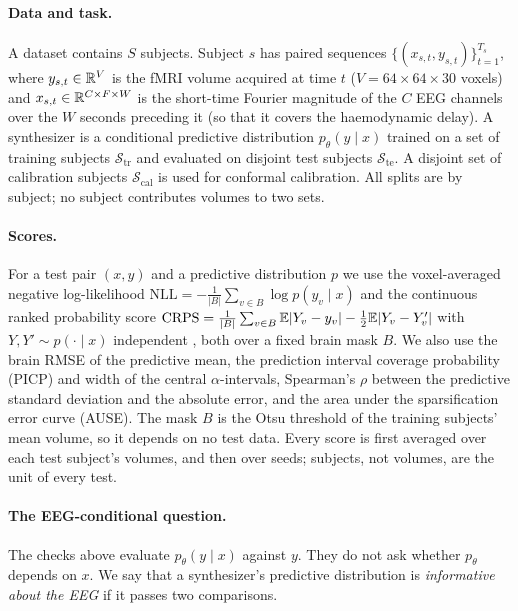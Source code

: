 \paragraph{Data and task.} A dataset contains $S$ subjects. Subject $s$ has paired sequences $\{(x_{s,t}, y_{s,t})\}_{t=1}^{T_s}$, where $y_{s,t}\in\mathbb{R}^{V}$ is the fMRI volume acquired at time $t$ ($V = 64\times 64\times 30$ voxels) and $x_{s,t}\in\mathbb{R}^{C\times F\times W}$ is the short-time Fourier magnitude of the $C$ EEG channels over the $W$ seconds preceding it (so that it covers the haemodynamic delay). A synthesizer is a conditional predictive distribution $p_\theta(y\mid x)$ trained on a set of training subjects $\mathcal{S}_{\mathrm{tr}}$ and evaluated on disjoint test subjects $\mathcal{S}_{\mathrm{te}}$. A disjoint set of calibration subjects $\mathcal{S}_{\mathrm{cal}}$ is used for conformal calibration. All splits are by subject; no subject contributes volumes to two sets.

\paragraph{Scores.} For a test pair $(x,y)$ and a predictive distribution $p$ we use the voxel-averaged negative log-likelihood $\mathrm{NLL} = -\frac{1}{|B|}\sum_{v\in B}\log p(y_v\mid x)$ and the continuous ranked probability score $\mathrm{CRPS} = \frac{1}{|B|}\sum_{v\in B}\mathbb{E}|Y_v-y_v| - \tfrac12\mathbb{E}|Y_v-Y'_v|$ with $Y,Y'\sim p(\cdot\mid x)$ independent \citep{gneiting2007strictly}, both over a fixed brain mask $B$. We also use the brain RMSE of the predictive mean, the prediction interval coverage probability (PICP) and width of the central $\alpha$-intervals, Spearman's $\rho$ between the predictive standard deviation and the absolute error, and the area under the sparsification error curve (AUSE). The mask $B$ is the Otsu threshold \citep{otsu1979threshold} of the training subjects' mean volume, so it depends on no test data. Every score is first averaged over each test subject's volumes, and then over seeds; subjects, not volumes, are the unit of every test.

\paragraph{The EEG-conditional question.} The checks above evaluate $p_\theta(y\mid x)$ against $y$. They do not ask whether $p_\theta$ depends on $x$. We say that a synthesizer's predictive distribution is \emph{informative about the EEG} if it passes two comparisons.

